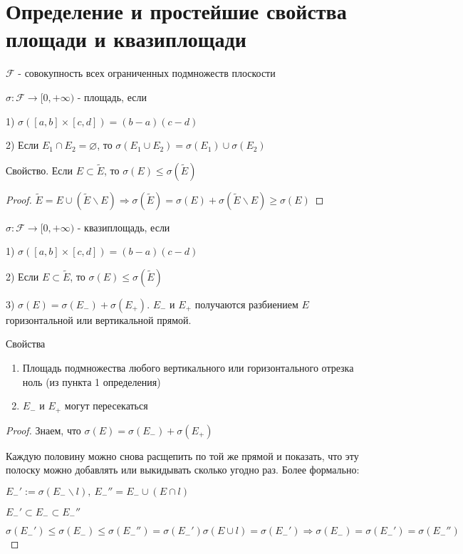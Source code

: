 \section{Определение и простейшие свойства площади и квазиплощади \href{https://youtu.be/p9C57KDo1Yg?t=6438}{\Walley}}

$\mathcal{F}$ - совокупность всех ограниченных подмножеств плоскости

\begin{conj}
    $\sigma: \mathcal{F} \to [0, +\infty)$ - площадь, если

    1) $\sigma([a, b]\times[c, d]) = (b-a)(c-d)$

    2) Если $E_1\cap E_2 = \varnothing$, то $\sigma(E_1 \cup E_2) = \sigma(E_1) \cup \sigma(E_2)$
\end{conj}

Свойство. Если $E \subset \widetilde{E}$, то
$\sigma(E) \leq \sigma(\widetilde{E})$

\begin{proof}
    $\widetilde{E} = E \cup (\widetilde{E} \backslash E) \Rightarrow
    \sigma(\widetilde{E}) = \sigma(E) + \sigma(\widetilde{E} \backslash E) \geq \sigma(E)$
\end{proof}

\begin{conj}
    $\sigma: \mathcal{F} \to [0, +\infty)$ - квазиплощадь, если

    1) $\sigma([a, b]\times[c, d]) = (b-a)(c-d)$

    2) Если $E \subset \widetilde{E}$, то $\sigma(E) \leq \sigma(\widetilde{E})$

    3) $\sigma(E) = \sigma(E_{-}) + \sigma(E_{+})$. $E_{-}$ и $E_{+}$ получаются
    разбиением $E$ горизонтальной или вертикальной прямой.
\end{conj}

Свойства
\begin{enumerate}
    \item Площадь подмножества любого вертикального или горизонтального отрезка ноль (из пункта 1 определения)
    \item $E_{-}$ и $E_{+}$ могут пересекаться 
\end{enumerate}

\begin{proof}
    Знаем, что $\sigma(E) = \sigma(E_-) + \sigma(E_+)$

    Каждую половину можно снова расщепить по той же прямой и показать, что эту полоску 
    можно добавлять или выкидывать сколько угодно раз.
    Более формально:

    $E_-' := \sigma(E_- \backslash l),\ 
    E_-'' = E_- \cup (E \cap l)$

    $E_-' \subset E_- \subset E_-''$

    \[\sigma(E_-') \leq \sigma(E_-) \leq \sigma(E_-'') = \sigma(E_-') \sigma(E \cup l) = \sigma(E_-') \Rightarrow
    \sigma(E_-) = \sigma(E_-') = \sigma(E_-'')\]
\end{proof}
